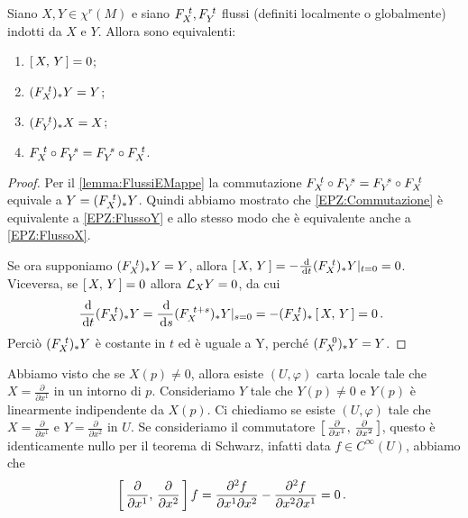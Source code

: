 \begin{proposition} \label{prop:EquivalenzaParentesiZero}
	Siano $X,Y\in\chi^r(M)$ e siano $F_{X}^{\ t},F_{Y}^{\ t}$ flussi (definiti localmente o globalmente) indotti da $X$ e $Y$. Allora sono equivalenti:
	\begin{enumerate}
	\item $\left[\,X,\,Y\,\right]=0$; \label{EPZ:ParentesiZero}
	\item $(F_{X}^{\ t})_*Y=Y$; \label{EPZ:FlussoY}
	\item $(F_{Y}^{\ t})_*X=X$; \label{EPZ:FlussoX}
	\item $F_{X}^{\ t}\circ F_{Y}^{\ s}=F_{Y}^{\ s}\circ F_{X}^{\ t}$. \label{EPZ:Commutazione}
	\end{enumerate}
\end{proposition}

\begin{proof} %
	Per il \cref{lemma:FlussiEMappe} la commutazione $F_{X}^{\ t}\circ F_{Y}^{\ s}=F_{Y}^{\ s}\circ F_{X}^{\ t}$ equivale a $Y=(F_{X}^{\ t})_*Y$. Quindi abbiamo mostrato che \ref{EPZ:Commutazione} è equivalente a \ref{EPZ:FlussoY} e allo stesso modo che è equivalente anche a \ref{EPZ:FlussoX}.
	
	Se ora supponiamo $(F_{X}^{\ t})_*Y=Y$, allora $\left[\,X,\,Y\,\right]=-\frac{\,\mathrm d}{\,\mathrm d t}(F_{X}^{\ t})_*Y|_{t=0}=0$. Viceversa, se $\left[\,X,\,Y\,\right]=0$ allora $\mathcal L_XY=0$, da cui
	\begin{equation*}
		\frac{\,\mathrm d}{\,\mathrm d t}(F_{X}^{\ t})_*Y=\frac{\,\mathrm d}{\,\mathrm d s}(F_{X}^{\ t+s})_*Y|_{s=0}=-(F_{X}^{\ t})_*\left[\,X,\,Y\,\right]=0\, \text{. }
	\end{equation*}
	Perciò  $(F_{X}^{\ t})_*Y$ è costante in $t$ ed è uguale a Y, perché $(F_{X}^{\ 0})_*Y=Y$.
\end{proof}

Abbiamo visto che se $X(p)\ne 0$, allora esiste $(U,\varphi)$ carta locale tale che $X=\frac{\partial}{\partial x^1}$ in un intorno di $p$. Consideriamo $Y$ tale che $Y(p)\neq 0$ e $Y(p)$ è linearmente indipendente da $X(p)$. Ci chiediamo se esiste $(U,\varphi)$ tale che $X=\frac{\partial}{\partial x^1}$ e $Y=\frac{\partial}{\partial x^2}$ in $U$. Se consideriamo il commutatore $\left[\,\frac{\partial}{\partial x^1},\,\frac{\partial}{\partial x^2}\,\right]$, questo è identicamente nullo per il teorema di Schwarz, infatti data $f\in C^\infty(U)$, abbiamo che
\begin{equation*}
	\left[\,\frac{\partial}{\partial x^1},\,\frac{\partial}{\partial x^2}\,\right]f=\frac{\partial^2f}{\partial x^1\partial x^2}-\frac{\partial^2f}{\partial x^2\partial x^1}=0\, \text{. }
\end{equation*}

